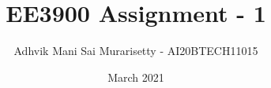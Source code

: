 \documentclass[journal,12pt,twocolumn]{IEEEtran}
\date{March 2021}
\DeclareMathOperator*{\Res}{Res}
\begin{document}
\newcommand{\BEQA}{\begin{eqnarray}}
\newcommand{\EEQA}{\end{eqnarray}}
\newcommand{\define}{\stackrel{\triangle}{=}}

\raggedbottom
\setlength{\parindent}{0pt}
\providecommand{\mbf}{\mathbf}
\providecommand{\pr}[1]{\ensuremath{\Pr\left(#1\right)}}
\providecommand{\qfunc}[1]{\ensuremath{Q\left(#1\right)}}
\providecommand{\fn}[1]{\ensuremath{f\left({#1}\right)}}
\providecommand{\e}[1]{\ensuremath{E\left(#1\right)}}
\providecommand{\sbrak}[1]{\ensuremath{{}\left[#1\right]}}
\providecommand{\lsbrak}[1]{\ensuremath{{}\left[#1\right.}}
\providecommand{\rsbrak}[1]{\ensuremath{{}\left.#1\right]}}
\providecommand{\brak}[1]{\ensuremath{\left(#1\right)}}
\providecommand{\lbrak}[1]{\ensuremath{\left(#1\right.}}
\providecommand{\rbrak}[1]{\ensuremath{\left.#1\right)}}
\providecommand{\cbrak}[1]{\ensuremath{\left\{#1\right\}}}
\providecommand{\lcbrak}[1]{\ensuremath{\left\{#1\right.}}
\providecommand{\rcbrak}[1]{\ensuremath{\left.#1\right\}}}
\theoremstyle{remark}
\newtheorem{rem}{Remark}
\newcommand{\sgn}{\mathop{\mathrm{sgn}}}
\newcommand{\comb}[2]{{}^{#1}\mathrm{C}_{#2}}
\providecommand{\abs}[1]{\vert#1\vert}
\providecommand{\res}[1]{\Res\displaylimits_{#1}} 
\providecommand{\norm}[1]{\lVert#1\rVert}
\providecommand{\mtx}[1]{\mathbf{#1}}
\providecommand{\mean}[1]{E\sbrak{ #1 }}
\providecommand{\fourier}{\overset{\mathcal{F}}{ \rightleftharpoons}}
\providecommand{\system}{\overset{\mathcal{H}}{ \longleftrightarrow}}
\newcommand{\solution}{\noindent \textbf{Solution: }}
\newcommand{\cosec}{\,\text{cosec}\,}
\providecommand{\dec}[2]{\ensuremath{\overset{#1}{\underset{#2}{\gtrless}}}}
\newcommand{\myvec}[1]{\ensuremath{\begin{pmatrix}#1\end{pmatrix}}}
\newcommand{\mydet}[1]{\ensuremath{\begin{vmatrix}#1\end{vmatrix}}}
\makeatletter
\vspace{3cm}
\title{EE3900 Assignment - 1}
\author{Adhvik Mani Sai Murarisetty - AI20BTECH11015}
\maketitle
\newpage
\bigskip
\renewcommand{\thetable}{\theenumi}
\end{document}
